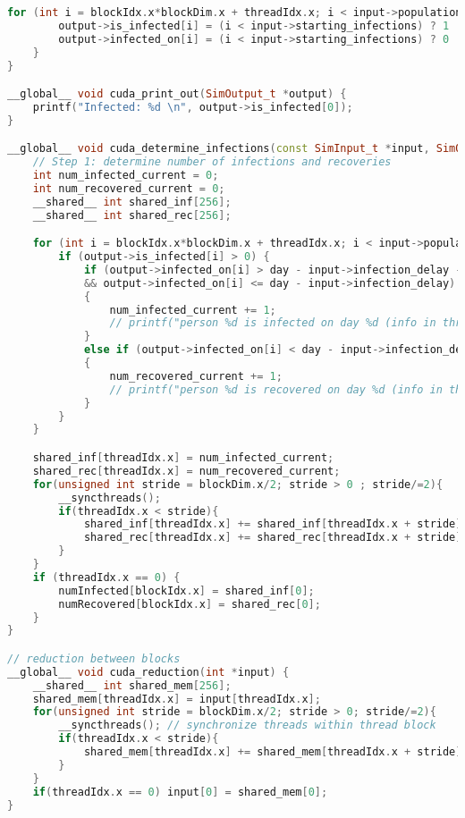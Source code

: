 \begin{lstlisting}[language=C++, title=C++ code for ]
    for (int i = blockIdx.x*blockDim.x + threadIdx.x; i < input->population_size; i += gridDim.x*blockDim.x) {
        output->is_infected[i] = (i < input->starting_infections) ? 1 : 0;
        output->infected_on[i] = (i < input->starting_infections) ? 0 : -1;
    }
}

__global__ void cuda_print_out(SimOutput_t *output) {
    printf("Infected: %d \n", output->is_infected[0]);
}

__global__ void cuda_determine_infections(const SimInput_t *input, SimOutput_t *output, int *numInfected, int *numRecovered, int day) {
    // Step 1: determine number of infections and recoveries
    int num_infected_current = 0;
    int num_recovered_current = 0;
    __shared__ int shared_inf[256];
    __shared__ int shared_rec[256];

    for (int i = blockIdx.x*blockDim.x + threadIdx.x; i < input->population_size; i += gridDim.x*blockDim.x) {
        if (output->is_infected[i] > 0) {
            if (output->infected_on[i] > day - input->infection_delay - input->infection_days
            && output->infected_on[i] <= day - input->infection_delay)   // currently infected and incubation period over
            {
                num_infected_current += 1;
                // printf("person %d is infected on day %d (info in thread %d in block %d)\n", i, day, threadIdx.x, blockIdx.x);
            }
            else if (output->infected_on[i] < day - input->infection_delay - input->infection_days)
            {
                num_recovered_current += 1;
                // printf("person %d is recovered on day %d (info in thread %d in block %d)\n", i, day);
            }
        }
    }

    shared_inf[threadIdx.x] = num_infected_current;
    shared_rec[threadIdx.x] = num_recovered_current;
    for(unsigned int stride = blockDim.x/2; stride > 0 ; stride/=2){
        __syncthreads();
        if(threadIdx.x < stride){
            shared_inf[threadIdx.x] += shared_inf[threadIdx.x + stride];
            shared_rec[threadIdx.x] += shared_rec[threadIdx.x + stride];
        }
    }
    if (threadIdx.x == 0) {
        numInfected[blockIdx.x] = shared_inf[0];
        numRecovered[blockIdx.x] = shared_rec[0];
    }
}

// reduction between blocks
__global__ void cuda_reduction(int *input) { 
    __shared__ int shared_mem[256];
    shared_mem[threadIdx.x] = input[threadIdx.x];
    for(unsigned int stride = blockDim.x/2; stride > 0; stride/=2){
        __syncthreads(); // synchronize threads within thread block
        if(threadIdx.x < stride){
            shared_mem[threadIdx.x] += shared_mem[threadIdx.x + stride];
        }
    }
    if(threadIdx.x == 0) input[0] = shared_mem[0];
}


\end{lstlisting}
